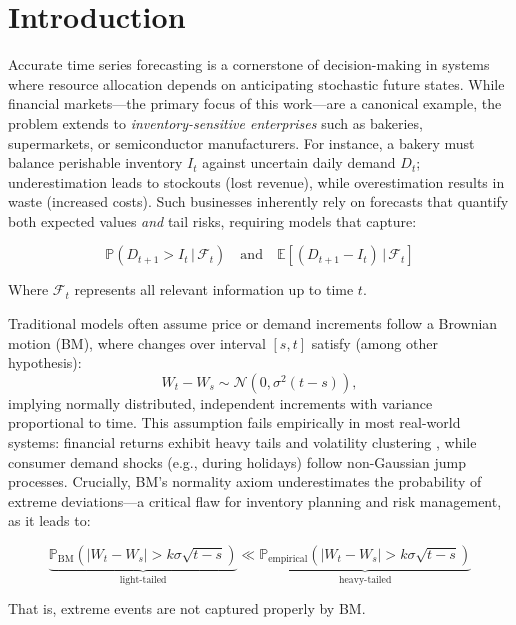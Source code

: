 \documentclass[12pt]{article}
\begin{document}
\section{Introduction}
\label{sec:introduction}

Accurate time series forecasting is a cornerstone of decision-making in systems where resource allocation depends on anticipating stochastic future states. While financial markets---the primary focus of this work---are a canonical example, the problem extends to \emph{inventory-sensitive enterprises} such as bakeries, supermarkets, or semiconductor manufacturers. For instance, a bakery must balance perishable inventory $I_t$ against uncertain daily demand $D_t$; underestimation leads to stockouts (lost revenue), while overestimation results in waste (increased costs). Such businesses inherently rely on forecasts that quantify both expected values \emph{and} tail risks, requiring models that capture:

\begin{equation}
    \mathbb{P}(D_{t+1} > I_t \,|\, \mathscr{F}_t) \quad \text{and} \quad \mathbb{E}[(D_{t+1} - I_t) \,|\, \mathscr{F}_t]
\end{equation}

Where $\mathscr{F}_t$ represents all relevant information up to time $t$.

Traditional models often assume price or demand increments follow a Brownian motion (BM), where changes over interval $[s, t]$ satisfy (among other hypothesis):
\begin{equation}
    W_t - W_s \sim \mathcal{N}(0, \sigma^2(t-s)), 
\end{equation}
implying normally distributed, independent increments with variance proportional to time. This assumption fails empirically in most real-world systems: financial returns exhibit heavy tails and volatility clustering \cite{cont2001}, while consumer demand shocks (e.g., during holidays) follow non-Gaussian jump processes. Crucially, BM's normality axiom underestimates the probability of extreme deviations---a critical flaw for inventory planning and risk management, as it leads to:

\begin{equation}
    \underbrace{\mathbb{P}_{\text{BM}}\left(|W_t - W_s| > k\sigma\sqrt{t-s}\right)}_{\text{light-tailed}} \ll \underbrace{\mathbb{P}_{\text{empirical}}(|W_t - W_s| > k\sigma\sqrt{t-s})}_{\text{heavy-tailed}}
\end{equation}

That is, extreme events are not captured properly by BM.
\end{document}
